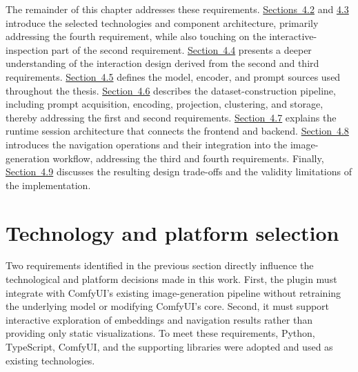 The remainder of this chapter addresses these requirements. \hyperref[sec:4.2]{Sections~4.2} and \hyperref[sec:4.3]{4.3} introduce the selected technologies and component architecture, primarily addressing the fourth requirement, while also touching on the interactive-inspection part of the second requirement. \hyperref[sec:4.4]{Section~4.4} presents a deeper understanding of the interaction design derived from the second and third requirements. \hyperref[sec:4.5]{Section~4.5} defines the model, encoder, and prompt sources used throughout the thesis. \hyperref[sec:4.6]{Section~4.6} describes the dataset-construction pipeline, including prompt acquisition, encoding, projection, clustering, and storage, thereby addressing the first and second requirements. \hyperref[sec:4.7]{Section~4.7} explains the runtime session architecture that connects the frontend and backend. \hyperref[sec:4.8]{Section~4.8} introduces the navigation operations and their integration into the image-generation workflow, addressing the third and fourth requirements. Finally, \hyperref[sec:4.9]{Section~4.9} discusses the resulting design trade-offs and the validity limitations of the implementation.

\section{Technology and platform selection}\label{sec:4.2}

Two requirements identified in the previous section directly influence the technological and platform decisions made in this work. First, the plugin must integrate with ComfyUI's existing image-generation pipeline without retraining the underlying model or modifying ComfyUI's core. Second, it must support interactive exploration of embeddings and navigation results rather than providing only static visualizations. To meet these requirements, Python, TypeScript, ComfyUI, and the supporting libraries were adopted and used as existing technologies.

